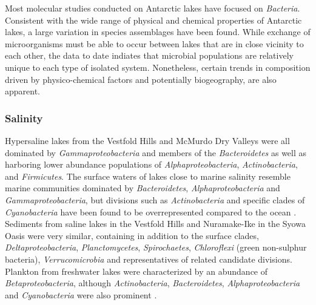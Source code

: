 Most molecular studies conducted on Antarctic lakes have focused on \emph{Bacteria}.
Consistent with the wide range of physical and chemical properties of Antarctic lakes, a large variation in species assemblages have been found.
While exchange of microorganisms must be able to occur between lakes that are in close vicinity to each other, the data to date indiates that microbial populations are relatively unique to each type of isolated system. 
Nonetheless, certain trends in composition driven by physico-chemical factors and potentially biogeography, are also apparent.
\subsubsection{Salinity}
Hypersaline lakes from the Vestfold Hills \cite{Bowman2000b} and McMurdo Dry Valleys \cite{Glatz2006, Mosier2007} were all dominated by \emph{Gammaproteobacteria} and members of the \emph{Bacteroidetes} as well as harboring lower abundance populations of \emph{Alphaproteobacteria}, \emph{Actinobacteria}, and \emph{Firmicutes}.
The surface waters of lakes close to marine salinity resemble marine communities dominated by \emph{Bacteroidetes}, \emph{Alphaproteobacteria} and \emph{Gammaproteobacteria}, but divisions such as \emph{Actinobacteria} and specific clades of \emph{Cyanobacteria} have been found to be overrepresented compared to the ocean \cite{Lauro2011}.
Sediments from saline lakes in the Vestfold Hills \cite{Bowman2000a} and Nuramake-Ike in the Syowa Oasis \cite{Kurosawa2010} were very similar, containing in addition to the surface clades, \emph{Deltaproteobacteria}, \emph{Planctomycetes}, \emph{Spirochaetes}, \emph{Chloroflexi} (green non-sulphur bacteria), \emph{Verrucomicrobia} and representatives of related candidate divisions.
Plankton from freshwater lakes were characterized by an abundance of \emph{Betaproteobacteria}, although \emph{Actinobacteria}, \emph{Bacteroidetes}, \emph{Alphaproteobacteria} and \emph{Cyanobacteria} were also prominent \cite{Pearce2003a, Pearce2005a, Pearce2005b, Schiaffino2009}. 
